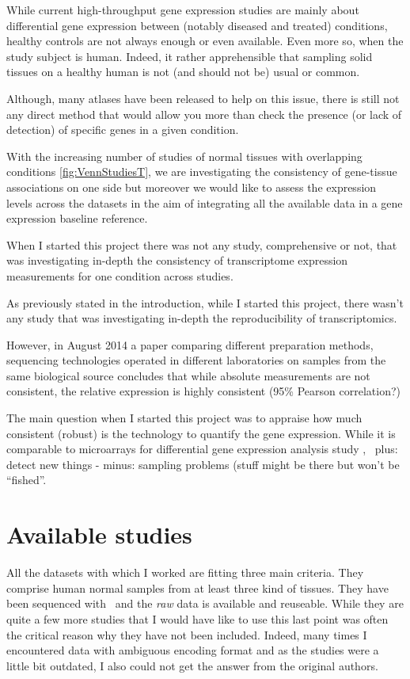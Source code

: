 While current high-throughput gene expression studies are mainly about
differential gene expression between (notably diseased and treated) conditions,
healthy controls are not always enough or even available. Even more so, when the
study subject is human. Indeed, it rather apprehensible that sampling solid
tissues on a healthy human is not (and should not be) usual or common.

Although, many atlases have been released to help on this issue,
there is still not any direct method that would allow you more than check the
presence (or lack of detection) of specific genes in a given condition.

With the increasing number of studies of normal tissues with overlapping conditions
\cref{fig:VennStudiesT}, we are investigating the consistency of gene-tissue
associations on
one side but moreover we would like to assess the expression levels across the
datasets in the aim of integrating all the available data in a gene expression
baseline reference.

When I started this project there was not any study, comprehensive or not, that
was investigating in-depth the consistency of transcriptome expression measurements
for one condition across studies.


As previously stated in the introduction, while I started this project,
there wasn't any study that was investigating in-depth the reproducibility of
transcriptomics.

However, in August 2014 a paper comparing different preparation methods,
sequencing technologies operated in different laboratories
on samples from the same biological source concludes that while absolute
measurements are not consistent, the relative expression is highly consistent
(95\% Pearson correlation?)

The main question when I started this project was to appraise how much consistent
(robust) is the \Rnaseq technology to quantify the gene expression. While it
is comparable to microarrays for differential gene expression analysis study
,
\Rnaseq\ plus: detect new things - minus: sampling problems (stuff might be there
but won't be ``fished''.


\section{Available studies}
\label{sec:Trans_AvailableStudies}

All the datasets with which I worked are fitting three main criteria.
They comprise human normal samples from at least three kind of tissues.
They have been sequenced with \Rnaseq\ and
the \emph{raw} data is available and reuseable.
While they are quite a few more studies that I would have like to use
this last point was often the critical reason why they have not been included.
Indeed, many times I encountered data with ambiguous encoding format and as the
studies were a little bit outdated,
I also could not get the answer from the original authors.

